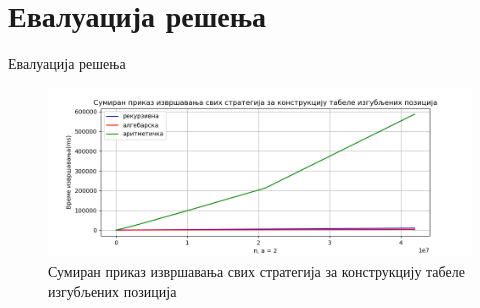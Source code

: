 \documentclass[10pt]{beamer}
\begin{document}
\section{Евалуација решења}

%	
%	
%
%	
%	
%
%	
%	

\begin{frame}{Евалуација решења}
	\begin{figure}[H]
		\begin{center}
			\includegraphics[width=\textwidth]{../src/statistics/picture/all.png}
		\end{center}
		\caption{Сумиран приказ извршавања свих стратегија за конструкцију табеле изгубљених позиција}
	\end{figure}
\end{frame}
\end{document}
